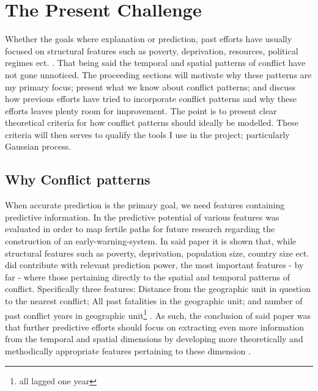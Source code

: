 \documentclass[a4paper]{article}
\begin{document}



\section{The Present Challenge} %

Whether the goals where explanation or prediction, past efforts have usually focused on structural features such as poverty, deprivation, resources, political regimes ect. \citep[10]{chadefaux2017conflict}. That being said the temporal and spatial patterns of conflict have not gone unnoticed. The proceeding sections will motivate why these patterns are my primary focus; present what we know about conflict patterns; and discuss how previous efforts have tried to incorporate conflict patterns and why these efforts leaves plenty room for improvement. The point is to present clear theoretical criteria for how conflict patterns should ideally be modelled. These criteria will then serves to qualify the tools I use in the project; particularly Gaussian process.\par 

\subsection{Why Conflict patterns}

When accurate prediction is the primary goal, we need features containing predictive information. In \cite{Maase} the predictive potential of various features was evaluated in order to map fertile paths for future research regarding the construction of an early-warning-system. In said paper it is shown that, while structural features such as poverty, deprivation, population size, country size ect. did contribute with relevant prediction power, the most important features - by far - where those pertaining directly to the spatial and temporal patterns of conflict. Specifically three features: Distance from the geographic unit in question to the nearest conflict; All past fatalities in the geographic unit; and number of past conflict years in geographic unit\footnote{all lagged one year} \citep[17-18]{Maase}. As such, the conclusion of said paper was that further predictive efforts should focus on extracting even more information from the temporal and spatial dimensions by developing more theoretically and methodically appropriate features pertaining to these dimension \citep[21-23]{Maase}.\par
\end{document}
